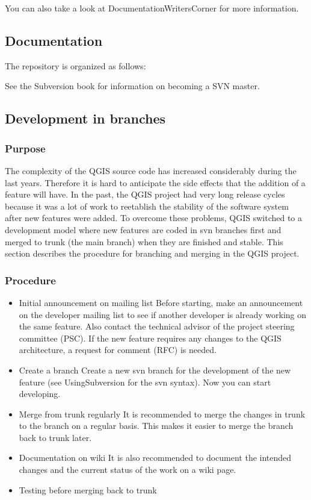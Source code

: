 You can also take a look at DocumentationWritersCorner for more information.

\subsection{Documentation}
The repository is organized as follows:


See the Subversion book  for information on becoming a SVN master.

\subsection{Development in branches}
\subsubsection{Purpose}
The complexity of the QGIS source code has increased considerably during the last years. Therefore it is hard 
to anticipate the side effects that the addition of a feature will have. In the past, the QGIS project had very 
long release cycles because it was a lot of work to reetablish the stability of the software system after new 
features were added. To overcome these problems, QGIS switched to a development model where new features are 
coded in svn branches first and merged to trunk (the main branch) when they are finished and stable. This section 
describes the procedure for branching and merging in the QGIS project.

\subsubsection{Procedure}

\begin{itemize} 
\item Initial announcement on mailing list
Before starting, make an announcement on the developer mailing list to see if another developer is 
already working on the same feature. Also contact the technical advisor of the project steering committee 
(PSC). If the new feature requires any changes to the QGIS architecture, a request for comment (RFC) is needed. 
\item Create a branch
Create a new svn branch for the development of the new feature (see UsingSubversion for the svn syntax). Now 
you can start developing.
\item Merge from trunk regularly
It is recommended to merge the changes in trunk to the branch on a regular basis. This makes it easier to merge 
the branch back to trunk later.
\item Documentation on wiki
It is also recommended to document the intended changes and the current status of the work on a wiki page.
\item Testing before merging back to trunk
\end{itemize}

